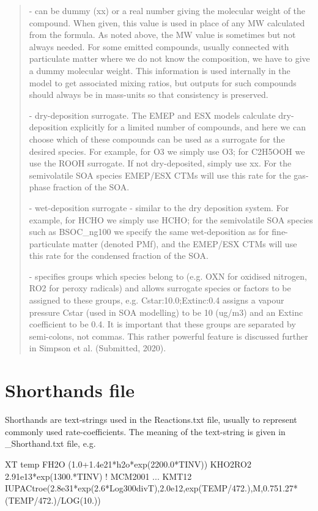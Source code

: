 \documentclass[a4paper,10pt,english]{sphinxmanual}
\begin{document}
\begin{quote}
 - can be dummy (xx) or a real number giving the molecular
weight of the compound. When given, this value is used in place of
any MW calculated from the formula. As noted above, the MW value is
sometimes but not always needed. For some emitted compounds, usually
connected with particulate matter where we do not know the composition,
we have to give a dummy molecular weight.  This information is used
internally in the model to get associated mixing ratios, but outputs
for such compounds should always be in mass-units so that consistency
is preserved.

 -  dry-deposition surrogate. The EMEP and ESX models calculate
dry-deposition explicitly for a limited number of compounds, and here
we can choose which of these compounds can be used as a surrogate
for the desired species.  For example, for O3 we simply use O3; for
C2H5OOH we use the ROOH surrogate. If not dry-deposited, simply use xx.
For the semivolatile SOA species EMEP/ESX CTMs will use this rate for
the gas-phase fraction of the SOA.

 - wet-deposition surrogate - similar to the dry deposition
system.  For example, for HCHO we simply use HCHO; for the semivolatile
SOA species such as BSOC\_ng100  we specify the same wet-deposition
as for fine-particulate matter (denoted PMf), and the EMEP/ESX CTMs
will use this rate  for the condensed fraction of the SOA.

 -  specifies groups which species belong to (e.g. OXN
for oxidised nitrogen, RO2 for peroxy radicals) and allows
surrogate species or factors to be assigned to these groups,
e.g. Cstar:10.0;Extinc:0.4 assigns a vapour pressure Cstar (used
in SOA modelling) to be 10 (ug/m3) and an Extinc coefficient to
be 0.4. It is important that these groups are
separated by semi-colons, not commas.  This rather powerful feature
is discussed further in Simpson et al. (Submitted, 2020).
\end{quote}


\section{Shorthands file}
\label{\detokenize{GenChemDoc_chem:shorthands-file}}
Shorthands are text-strings used in the Reactions.txt file, usually to represent commonly used rate-coefficients. The meaning of the text-string is given in \_Shorthand.txt file, e.g.

\begin{sphinxVerbatim}[commandchars=\\\{\}]
XT           temp
FH2O         (1.0+1.4e\PYGZhy{}21*h2o*exp(2200.0*TINV))
KHO2RO2      2.91e\PYGZhy{}13*exp(1300.*TINV) ! MCM2001 ...
KMT12        IUPAC\PYGZus{}troe(2.8e\PYGZhy{}31*exp(2.6*Log300divT),2.0e\PYGZhy{}12,exp(\PYGZhy{}TEMP/472.),M,0.75\PYGZhy{}1.27*(\PYGZhy{}TEMP/472.)/LOG(10.))
\end{sphinxVerbatim}
\end{document}
